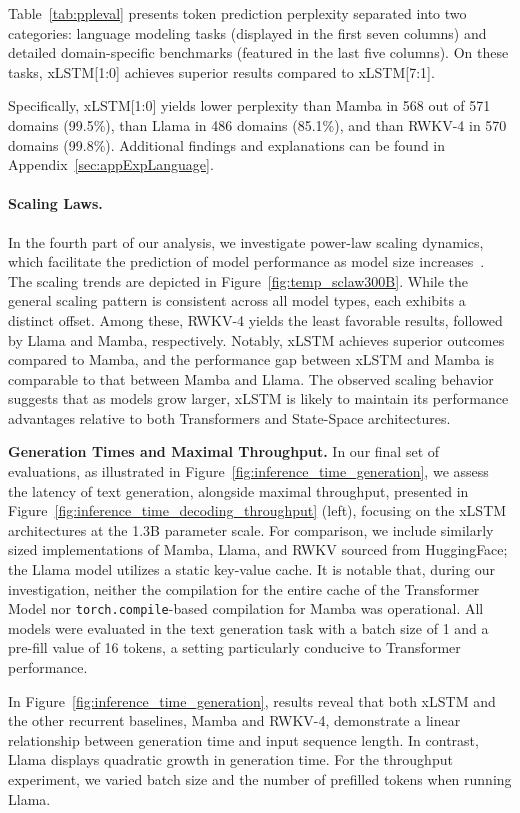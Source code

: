 Table~\ref{tab:ppleval} presents token prediction perplexity separated into two categories: language modeling tasks (displayed in the first seven columns) and detailed domain-specific benchmarks (featured in the last five columns). On these tasks, xLSTM[1:0] achieves superior results compared to xLSTM[7:1].

Specifically, xLSTM[1:0] yields lower perplexity than Mamba in 568 out of 571 domains (99.5\%), than Llama in 486 domains (85.1\%), and than RWKV-4 in 570 domains (99.8\%). Additional findings and explanations can be found in Appendix~\ref{sec:appExpLanguage}.

\paragraph{Scaling Laws.} In the fourth part of our analysis, we investigate power-law scaling dynamics, which facilitate the prediction of model performance as model size increases~\citep{Kaplan:20,Brown:20short}. The scaling trends are depicted in Figure~\ref{fig:temp_sclaw300B}. While the general scaling pattern is consistent across all model types, each exhibits a distinct offset. Among these, RWKV-4 yields the least favorable results, followed by Llama and Mamba, respectively. Notably, xLSTM achieves superior outcomes compared to Mamba, and the performance gap between xLSTM and Mamba is comparable to that between Mamba and Llama. The observed scaling behavior suggests that as models grow larger, xLSTM is likely to maintain its performance advantages relative to both Transformers and State-Space architectures.

\textbf{Generation Times and Maximal Throughput.} In our final set of evaluations, as illustrated in Figure~\ref{fig:inference_time_generation}, we assess the latency of text generation, alongside maximal throughput, presented in Figure~\ref{fig:inference_time_decoding_throughput} (left), focusing on the xLSTM architectures at the 1.3B parameter scale. For comparison, we include similarly sized implementations of Mamba, Llama, and RWKV sourced from HuggingFace; the Llama model utilizes a static key-value cache. It is notable that, during our investigation, neither the compilation for the entire cache of the Transformer Model nor \texttt{torch.compile}-based compilation for Mamba was operational. All models were evaluated in the text generation task with a batch size of 1 and a pre-fill value of 16 tokens, a setting particularly conducive to Transformer performance.

In Figure~\ref{fig:inference_time_generation}, results reveal that both xLSTM and the other recurrent baselines, Mamba and RWKV-4, demonstrate a linear relationship between generation time and input sequence length. In contrast, Llama displays quadratic growth in generation time. For the throughput experiment, we varied batch size and the number of prefilled tokens when running Llama. 

